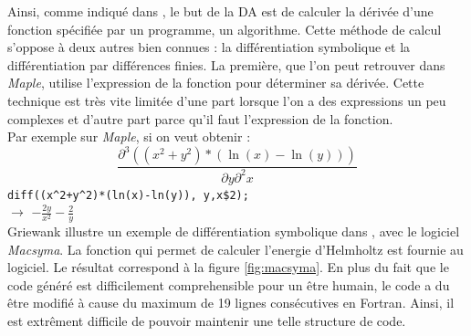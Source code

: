 Ainsi, comme indiqu\'e dans \cite{differentiaauto}, le but de la DA est de calculer la d\'eriv\'ee d'une fonction sp\'ecifi\'ee par
un programme, un algorithme. Cette m\'ethode de calcul s'oppose \`a deux autres
bien connues : la diff\'erentiation symbolique et la diff\'erentiation par
diff\'erences finies. La premi\`ere, que l'on peut retrouver dans {\it Maple}, 
utilise l'expression de la fonction pour d\'eterminer sa d\'eriv\'ee.
Cette technique est tr\`es vite limit\'ee d'une part lorsque l'on a des
expressions un peu complexes et d'autre part parce qu'il faut l'expression de la
fonction. \\
Par exemple sur {\it Maple}, si on veut obtenir :
\[\frac{\partial^3((x^2+y^2)*(\ln(x)-\ln(y)))}{\partial y \partial^2x}\]
\verb!diff((x^2+y^2)*(ln(x)-ln(y)), y,x$2);!\\
$\rightarrow$ $-\frac{2y}{x^2}-\frac{2}{y}$
\\
%

{\co
Griewank illustre un exemple de diff\'erentiation symbolique dans \cite{Iri89onautomatic}, avec le logiciel {\it Macsyma}. La fonction
qui permet de calculer l'energie d'Helmholtz est fournie au logiciel. Le r\'esultat correspond \`a la figure \ref{fig:macsyma}. 
En plus du fait que le code g\'en\'er\'e est difficilement comprehensible pour un être humain, le code a du être modifi\'e \`a cause 
du maximum de 19 lignes cons\'ecutives en Fortran. Ainsi, il est extrêment difficile de pouvoir maintenir une telle structure de code.
}

